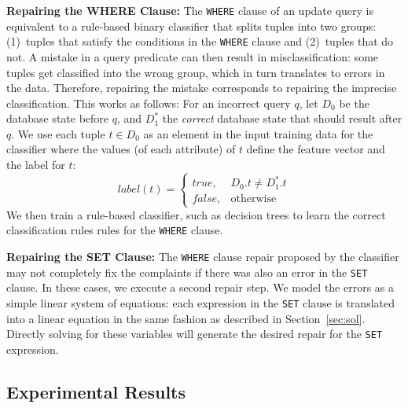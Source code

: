 \noindent
\textbf{Repairing the WHERE Clause:}
The \texttt{WHERE} clause of an update query is equivalent to a
rule-based binary classifier that splits tuples into two groups:
(1)~tuples that satisfy the conditions in the \texttt{WHERE} clause
and (2)~tuples that do not. A mistake in a query predicate can then
result in misclassification: some tuples get classified into the wrong
group, which in turn translates to errors in the data. Therefore,
repairing the mistake corresponds to repairing the imprecise
classification. This works as follows: For an incorrect query $q$, let
$D_0$ be the database state before $q$, and $D_1^*$ the \emph{correct}
database state that should result after $q$.
We use each tuple $t \in D_0$ as an element in the input training data
for the classifier where the values (of each attribute) of $t$ define
the feature vector and the label for $t$:
	\[
    label(t)= 
    \begin{cases}
    true ,& D_0.t \neq D_1^*.t\\
    false,              & \text{otherwise}
    \end{cases}
\]
We then train a rule-based classifier, 
such as decision trees \cite{quinlan1987} to learn
the correct classification rules rules for the \texttt{WHERE} clause.


\noindent
\textbf{Repairing the SET Clause:}
The \texttt{WHERE} clause repair proposed by the classifier may not completely fix 
the complaints if there was also an error in the \texttt{SET} clause.  In these cases,
we execute a second repair step.
We model the errors as a simple linear system of equations: 
each expression in the \texttt{SET} clause is translated into a
linear equation in the same fashion as described in Section~\ref{sec:sol}.
Directly solving for these variables will generate the desired repair for the \texttt{SET} expression.

\subsection{Experimental Results}

